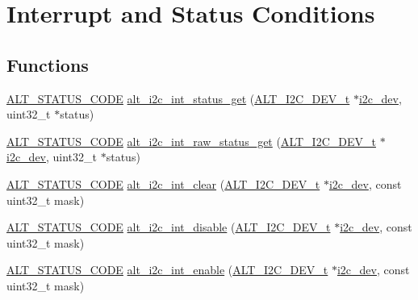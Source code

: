 \hypertarget{group__ALT__I2C__INT}{}\section{Interrupt and Status Conditions}
\label{group__ALT__I2C__INT}
\subsection*{Functions}
\begin{DoxyCompactItemize}
\item 
\mbox{\hyperlink{hwlib_8h_abdb0d369f069723ca55d6c94bcaaaa12}{A\+L\+T\+\_\+\+S\+T\+A\+T\+U\+S\+\_\+\+C\+O\+DE}} \mbox{\hyperlink{group__ALT__I2C__INT_ga55a40d841dd93d2861a4597603844776}{alt\+\_\+i2c\+\_\+int\+\_\+status\+\_\+get}} (\mbox{\hyperlink{structALT__I2C__DEV__s}{A\+L\+T\+\_\+\+I2\+C\+\_\+\+D\+E\+V\+\_\+t}} $\ast$\mbox{\hyperlink{structi2c__dev}{i2c\+\_\+dev}}, uint32\+\_\+t $\ast$status)
\item 
\mbox{\hyperlink{hwlib_8h_abdb0d369f069723ca55d6c94bcaaaa12}{A\+L\+T\+\_\+\+S\+T\+A\+T\+U\+S\+\_\+\+C\+O\+DE}} \mbox{\hyperlink{group__ALT__I2C__INT_ga15ff55010cad84db0476be38e064851d}{alt\+\_\+i2c\+\_\+int\+\_\+raw\+\_\+status\+\_\+get}} (\mbox{\hyperlink{structALT__I2C__DEV__s}{A\+L\+T\+\_\+\+I2\+C\+\_\+\+D\+E\+V\+\_\+t}} $\ast$\mbox{\hyperlink{structi2c__dev}{i2c\+\_\+dev}}, uint32\+\_\+t $\ast$status)
\item 
\mbox{\hyperlink{hwlib_8h_abdb0d369f069723ca55d6c94bcaaaa12}{A\+L\+T\+\_\+\+S\+T\+A\+T\+U\+S\+\_\+\+C\+O\+DE}} \mbox{\hyperlink{group__ALT__I2C__INT_gae00500b27051a82ff75905e777f0e1c8}{alt\+\_\+i2c\+\_\+int\+\_\+clear}} (\mbox{\hyperlink{structALT__I2C__DEV__s}{A\+L\+T\+\_\+\+I2\+C\+\_\+\+D\+E\+V\+\_\+t}} $\ast$\mbox{\hyperlink{structi2c__dev}{i2c\+\_\+dev}}, const uint32\+\_\+t mask)
\item 
\mbox{\hyperlink{hwlib_8h_abdb0d369f069723ca55d6c94bcaaaa12}{A\+L\+T\+\_\+\+S\+T\+A\+T\+U\+S\+\_\+\+C\+O\+DE}} \mbox{\hyperlink{group__ALT__I2C__INT_gae81d1d1af98f385fd6202d382af93ecc}{alt\+\_\+i2c\+\_\+int\+\_\+disable}} (\mbox{\hyperlink{structALT__I2C__DEV__s}{A\+L\+T\+\_\+\+I2\+C\+\_\+\+D\+E\+V\+\_\+t}} $\ast$\mbox{\hyperlink{structi2c__dev}{i2c\+\_\+dev}}, const uint32\+\_\+t mask)
\item 
\mbox{\hyperlink{hwlib_8h_abdb0d369f069723ca55d6c94bcaaaa12}{A\+L\+T\+\_\+\+S\+T\+A\+T\+U\+S\+\_\+\+C\+O\+DE}} \mbox{\hyperlink{group__ALT__I2C__INT_ga8b2d5d1cdd08eb4c7d431bf42532ef85}{alt\+\_\+i2c\+\_\+int\+\_\+enable}} (\mbox{\hyperlink{structALT__I2C__DEV__s}{A\+L\+T\+\_\+\+I2\+C\+\_\+\+D\+E\+V\+\_\+t}} $\ast$\mbox{\hyperlink{structi2c__dev}{i2c\+\_\+dev}}, const uint32\+\_\+t mask)

\end{DoxyCompactItemize}
